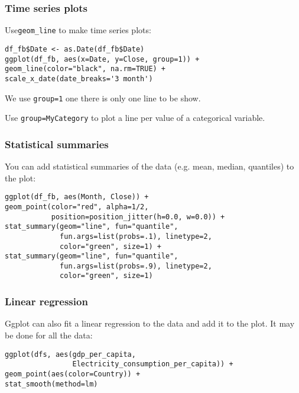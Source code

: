 \documentclass{beamer}
\begin{document}
	\begin{frame}[fragile]
		\frametitle{Time series plots}

		Use\verb|geom_line| to make time series plots:

		\vspace{2em}

		\begin{exampleblock}{}
		\begin{BVerbatim}
df_fb$Date <- as.Date(df_fb$Date)
ggplot(df_fb, aes(x=Date, y=Close, group=1)) + 
geom_line(color="black", na.rm=TRUE) +
scale_x_date(date_breaks='3 month')
		\end{BVerbatim}
		\end{exampleblock}{}

		\vspace{2em}

		We use \verb|group=1| one there is only one line to be show.

		\vspace{2em}

		Use \verb|group=MyCategory| to plot a line per value of a categorical variable.

	\end{frame}

	\begin{frame}[fragile]
		\frametitle{Statistical summaries}

		You can add statistical summaries of the data (e.g. mean, median, quantiles) to the plot:

		\vspace{2em}
	
		\begin{exampleblock}{}
		\begin{BVerbatim}
ggplot(df_fb, aes(Month, Close)) + 
geom_point(color="red", alpha=1/2,
           position=position_jitter(h=0.0, w=0.0)) +
stat_summary(geom="line", fun="quantile",
             fun.args=list(probs=.1), linetype=2,
             color="green", size=1) +
stat_summary(geom="line", fun="quantile",
             fun.args=list(probs=.9), linetype=2,
             color="green", size=1)
		\end{BVerbatim}
		\end{exampleblock}{}

	\end{frame}

	\begin{frame}[fragile]
		\frametitle{Linear regression}

		Ggplot can also fit a linear regression to the data and add it to the plot. It may be done for all the data:

		\vspace{2em}
	
		\begin{exampleblock}{}
		\begin{BVerbatim}
ggplot(dfs, aes(gdp_per_capita,
                Electricity_consumption_per_capita)) +
geom_point(aes(color=Country)) +
stat_smooth(method=lm)
		\end{BVerbatim}
		\end{exampleblock}{}

	\end{frame}
\end{document}
